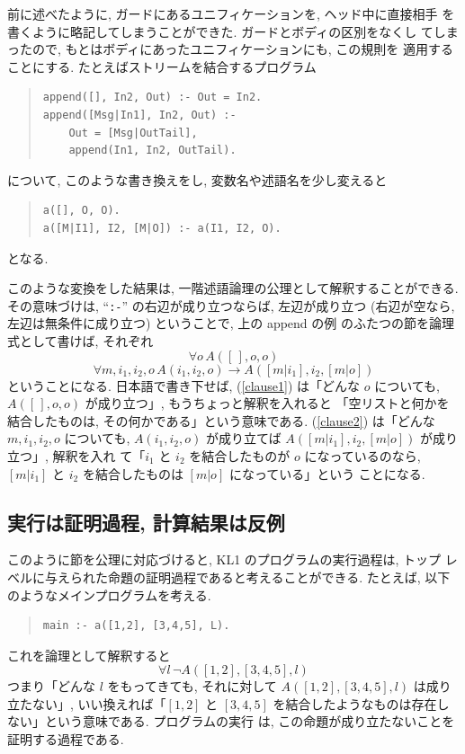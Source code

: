 \documentclass[a4,titlepage]{jsreport}
\newenvironment{program}{\begin{quote}}{\end{quote}}
\begin{document}
前に述べたように, ガードにあるユニフィケーションを, ヘッド中に直接相手
を書くように略記してしまうことができた.  ガードとボディの区別をなくし
てしまったので, もとはボディにあったユニフィケーションにも, この規則を
適用することにする.  たとえばストリームを結合するプログラム
\begin{program}
\begin{Verbatim}[baselinestretch=0.8]
append([], In2, Out) :- Out = In2.
append([Msg|In1], In2, Out) :-
    Out = [Msg|OutTail],
    append(In1, In2, OutTail).
\end{Verbatim}
\end{program}
について, このような書き換えをし, 変数名や述語名を少し変えると
\begin{program}
\begin{Verbatim}[baselinestretch=0.8]
a([], O, O).
a([M|I1], I2, [M|O]) :- a(I1, I2, O).
\end{Verbatim}
\end{program}
となる.

このような変換をした結果は, 一階述語論理の公理として解釈することができる.
その意味づけは, ``{\tt :-}'' の右辺が成り立つならば, 左辺が成り立つ 
(右辺が空なら, 左辺は無条件に成り立つ) ということで, 上の append の例
のふたつの節を論理式として書けば, それぞれ
\begin{equation}\label{clause1}
\forall o\, A([\,], o, o)
\end{equation}
\begin{equation}\label{clause2}
\forall m, i_1, i_2, o\,
A(i_1, i_2, o) \rightarrow A([m|i_1], i_2, [m|o])
\end{equation}
ということになる.  日本語で書き下せば, (\ref{clause1}) は「どんな \(o\) 
についても, \(A([\,], o, o)\) が成り立つ」, もうちょっと解釈を入れると
「空リストと何かを結合したものは, その何かである」という意味である.
(\ref{clause2}) は「どんな \(m, i_1, i_2, o\) についても, \(A(i_1, i_2,
o)\) が成り立てば \(A([m|i_1], i_2, [m|o])\) が成り立つ」, 解釈を入れ
て「\(i_1\) と \(i_2\) を結合したものが \(o\) になっているのなら,
\([m|i_1]\) と \(i_2\) を結合したものは \([m|o]\) になっている」という
ことになる.

\subsection{実行は証明過程, 計算結果は反例}

このように節を公理に対応づけると, KL1 のプログラムの実行過程は, トップ
レベルに与えられた命題の証明過程であると考えることができる.  たとえば, 
以下のようなメインプログラムを考える.
\begin{program}
\begin{verbatim}
main :- a([1,2], [3,4,5], L).
\end{verbatim}
\end{program}
これを論理として解釈すると
\begin{equation}\label{query}
\forall l\, \lnot A([1,2], [3,4,5], l)
\end{equation}
つまり「どんな \(l\) をもってきても, それに対して \(A([1, 2], [3, 4,
5], l)\) は成り立たない」, いい換えれば「\([1, 2]\) と \([3, 4, 5]\) 
を結合したようなものは存在しない」という意味である.  プログラムの実行
は, この命題が成り立たないことを証明する過程である.
\end{document}
